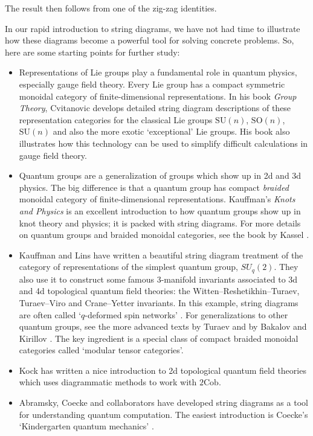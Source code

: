 \documentclass[12pt,twoside,openright]{report}
\newcommand{\Cob}{\mathrm{Cob}}
\begin{document}
The result then follows from one of the zig-zag identities.  

In our rapid introduction to string diagrams, we have not had time to illustrate how these diagrams become a powerful tool for solving concrete problems.  So, here are some starting points for further study:

\begin{itemize}
\item Representations of Lie groups play a fundamental role in quantum physics, especially gauge field theory. Every Lie group has a compact symmetric monoidal category of finite-dimensional representations.  In his book
{\sl Group Theory}, Cvitanovic \cite{Cvitanovic} develops detailed string diagram descriptions of these representation categories for the classical Lie groups 
$\mathrm{SU}(n)$, $\mathrm{SO}(n)$, $\mathrm{SU}(n)$ and also the more exotic `exceptional' Lie groups. His book also illustrates how this technology can be used to simplify difficult calculations in gauge field theory.
\item Quantum groups are a generalization of groups which show up in 2d and 3d physics.  The big difference is that a quantum group has compact {\em braided} monoidal category of finite-dimensional representations.  Kauffman's {\sl Knots and Physics} \cite{Kauffman} 
is an excellent introduction to how quantum groups show up in knot theory and physics; it is packed with string diagrams. For more details on quantum groups and braided monoidal categories, see the book by Kassel \cite{Kassel}.
\item Kauffman and Lins \cite{KaufmanLins} have written a beautiful string diagram treatment of the category of representations of the simplest quantum group, $SU_q(2)$.  They also use it to construct some famous 
3-manifold invariants associated to 3d and 4d topological quantum field theories: the Witten--Reshetikhin--Turaev, Turaev--Viro and Crane--Yetter invariants.  In this example, string diagrams are often called 
`$q$-deformed spin networks' \cite{Smolin}.  For generalizations to other quantum groups, see the more advanced texts by Turaev 
\cite{Turaev} and by Bakalov and Kirillov \cite{BK}. The key ingredient is a special class of compact braided monoidal categories called `modular tensor categories'.
\item Kock \cite{Kock04} has written a nice introduction to 2d topological quantum field theories which uses diagrammatic methods to work with $2\Cob$.
\item Abramsky, Coecke and collaborators \cite{Abramsky,AC,AD,Coecke1, CP1,CP2} have developed string diagrams as a tool for understanding quantum computation.  The easiest introduction is Coecke's 
`Kindergarten quantum mechanics' \cite{Coecke2}.
\end{itemize}
\end{document}

